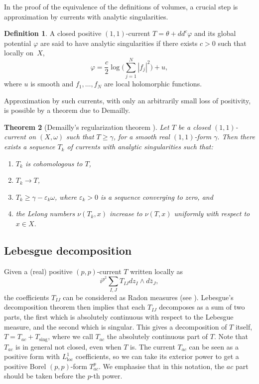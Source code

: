 \documentclass[a4paper]{amsart}
\renewcommand{\epsilon}{\varepsilon}
\newtheorem{theorem}{Theorem}[section]
\theoremstyle{definition}
\newtheorem{definition}[theorem]{Definition}
\begin{document}
In the proof of the equivalence of the definitions of volumes, a crucial step is approximation by currents with analytic singularities.
\begin{definition}
	A closed positive $(1, 1)$-current $T = \theta + dd^c\varphi$ and its global potential $\varphi$ are said to have analytic singularities if there exists $c > 0$ such that locally on~$X$,
	\[
	    \varphi = \frac{c}{2}\log\biggl(\sum_{j=1}^N |f_j|^2\biggr) + u,
	\]
	where $u$ is smooth and $f_1, \dots, f_N$ are local holomorphic functions. 
\end{definition}
 Approximation by such currents, with only an arbitrarily small loss of positivity, is possible by a theorem due to Demailly.
 \begin{theorem}[Demailly's regularization theorem \cite{DemReg}]\label{thm: approx}
     Let $T$ be a closed $(1, 1)$-current on $(X, \omega)$ such that $T \ge \gamma$, for a smooth real $(1, 1)$-form $\gamma.$ Then there exists a sequence $T_k$ of currents with analytic singularities such that:
     \begin{enumerate}
     \item $T_k$ is cohomologous to $T$,
        \item $T_k \to T$,
        \item  $T_k \ge \gamma - \epsilon_k \omega$, where $\epsilon_k > 0$ is a sequence converging to zero, and
        \item  the Lelong numbers $\nu(T_k, x)$ increase to $\nu(T, x)$ uniformly with respect to $x\in X$.
     \end{enumerate}
 \end{theorem}
\subsection{Lebesgue decomposition}\label{ssec: lebesgue}
Given a (real) positive $(p, p)$-current $T$ written locally as
\[i^{p^2}\sum_{I, J} T_{IJ}dz_{I}\wedge d\bar{z}_J,\]
the coefficients $T_{IJ}$ can be considered as Radon measures (see \cite[Proposition 1.5]{Kolo}). Lebesgue's decomposition theorem then implies that each $T_{IJ}$ decomposes as a sum of two parts, the first which is absolutely continuous with respect to the Lebesgue measure, and the second which is singular. This gives a decomposition of $T$ itself, $T = T_{ac} + T_{\text{sing}}$, where we call $T_{ac}$ the absolutely continuous part of $T$. Note that $T_{ac}$ is in general not closed, even when $T$ is. The current $T_{ac}$ can be seen as a positive form with $L^1_{\text{loc}}$ coefficients, so we can take its exterior power to get a positive Borel $(p, p)$-form $T_{ac}^p$. We emphasise that in this notation, the $ac$ part should be taken before the $p$-th power.
\end{document}
